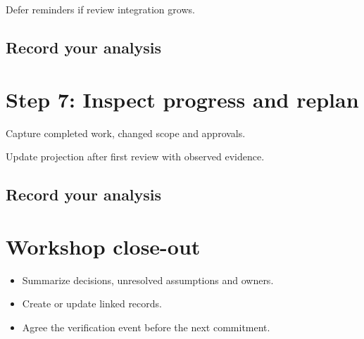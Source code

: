 \documentclass[11pt,letterpaper]{article}
\begin{document}
\begin{tcolorbox}[colback=tealback,colframe=navy,title={Illustration},breakable]
Defer reminders if review integration grows.

\end{tcolorbox}
\subsection{Record your analysis}
\section{Step 7: Inspect progress and replan}
Capture completed work, changed scope and approvals.

\begin{tcolorbox}[colback=tealback,colframe=navy,title={Illustration},breakable]
Update projection after first review with observed evidence.

\end{tcolorbox}
\subsection{Record your analysis}
\section{Workshop close-out}
\begin{itemize}[leftmargin=*,itemsep=2pt]
\item Summarize decisions, unresolved assumptions and owners.
\item Create or update linked records.
\item Agree the verification event before the next commitment.
\end{itemize}
\end{document}
